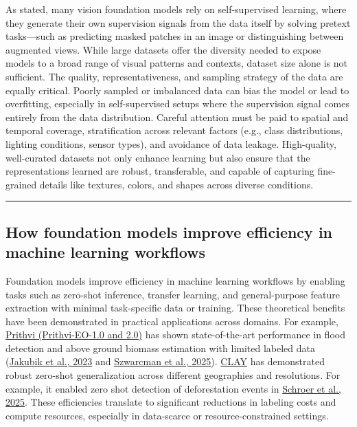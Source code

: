 \documentclass[
  letterpaper,
  DIV=11,
  numbers=noendperiod]{scrreprt}
\begin{document}
As stated, many vision foundation models rely on self-supervised
learning, where they generate their own supervision signals from the
data itself by solving pretext tasks---such as predicting masked patches
in an image or distinguishing between augmented views. While large
datasets offer the diversity needed to expose models to a broad range of
visual patterns and contexts, dataset size alone is not sufficient. The
quality, representativeness, and sampling strategy of the data are
equally critical. Poorly sampled or imbalanced data can bias the model
or lead to overfitting, especially in self-supervised setups where the
supervision signal comes entirely from the data distribution. Careful
attention must be paid to spatial and temporal coverage, stratification
across relevant factors (e.g., class distributions, lighting conditions,
sensor types), and avoidance of data leakage. High-quality, well-curated
datasets not only enhance learning but also ensure that the
representations learned are robust, transferable, and capable of
capturing fine-grained details like textures, colors, and shapes across
diverse conditions.

\begin{center}\rule{0.5\linewidth}{0.5pt}\end{center}

\subsection{How foundation models improve efficiency in machine learning
workflows}\label{how-foundation-models-improve-efficiency-in-machine-learning-workflows}

Foundation models improve efficiency in machine learning workflows by
enabling tasks such as zero-shot inference, transfer learning, and
general-purpose feature extraction with minimal task-specific data or
training. These theoretical benefits have been demonstrated in practical
applications across domains. For example,
\href{https://huggingface.co/collections/ibm-nasa-geospatial/prithvi-for-earth-observation-6740a7a81883466bf41d93d6}{Prithvi
(Prithvi-EO-1.0 and 2.0)} has shown state-of-the-art performance in
flood detection and above ground biomass estimation with limited labeled
data (\href{https://doi.org/10.48550/arXiv.2310.18660}{Jakubik et al.,
2023} and \href{https://doi.org/10.48550/arXiv.2412.02732}{Szwarcman et
al., 2025}).
\href{https://clay-foundation.github.io/model/index.html}{CLAY} has
demonstrated robust zero-shot generalization across different
geographies and resolutions. For example, it enabled zero shot detection
of deforestation events in
\href{https://aws.amazon.com/blogs/machine-learning/revolutionizing-earth-observation-with-geospatial-foundation-models-on-aws/}{Schroer
et al., 2025}. These efficiencies translate to significant reductions in
labeling costs and compute resources, especially in data-scarce or
resource-constrained settings.
\end{document}

